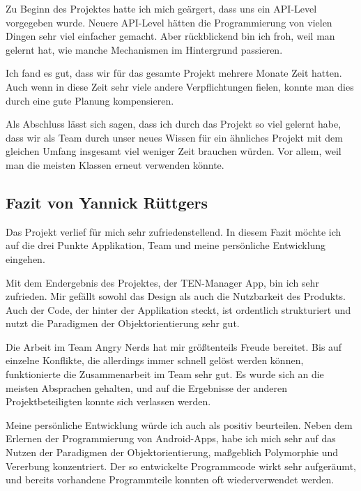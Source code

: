 Zu Beginn des Projektes hatte ich mich geärgert, dass uns ein API-Level vorgegeben wurde. Neuere API-Level hätten die Programmierung von vielen Dingen sehr viel einfacher gemacht. Aber rückblickend bin ich froh, weil man gelernt hat, wie manche Mechanismen im Hintergrund passieren.

Ich fand es gut, dass wir für das gesamte Projekt mehrere Monate Zeit hatten. Auch wenn in diese Zeit sehr viele andere Verpflichtungen fielen, konnte man dies durch eine gute Planung kompensieren.

Als Abschluss lässt sich sagen, dass ich durch das Projekt so viel gelernt habe, dass wir als Team durch unser neues Wissen für ein ähnliches Projekt mit dem gleichen Umfang insgesamt viel weniger Zeit brauchen würden. Vor allem, weil man die meisten Klassen erneut verwenden könnte.

\subsection{Fazit von Yannick Rüttgers}

Das Projekt verlief für mich sehr zufriedenstellend. In diesem Fazit möchte ich auf die drei Punkte Applikation, Team und meine persönliche Entwicklung eingehen.

Mit dem Endergebnis des Projektes, der TEN-Manager App, bin ich sehr zufrieden. Mir gefällt sowohl das Design als auch die Nutzbarkeit des Produkts. Auch der Code, der hinter der Applikation steckt, ist ordentlich strukturiert und nutzt die Paradigmen der Objektorientierung sehr gut.

Die Arbeit im Team Angry Nerds hat mir größtenteils Freude bereitet. Bis auf einzelne Konflikte, die allerdings immer schnell gelöst werden können, funktionierte die Zusammenarbeit im Team sehr gut. Es wurde sich an die meisten Absprachen gehalten, und auf die Ergebnisse der anderen Projektbeteiligten konnte sich verlassen werden.

Meine persönliche Entwicklung würde ich auch als positiv beurteilen. Neben dem Erlernen der Programmierung von Android-Apps, habe ich mich sehr auf das Nutzen der Paradigmen der Objektorientierung, maßgeblich Polymorphie und Vererbung konzentriert. Der so entwickelte Programmcode wirkt sehr aufgeräumt, und bereits vorhandene Programmteile konnten oft wiederverwendet werden.



